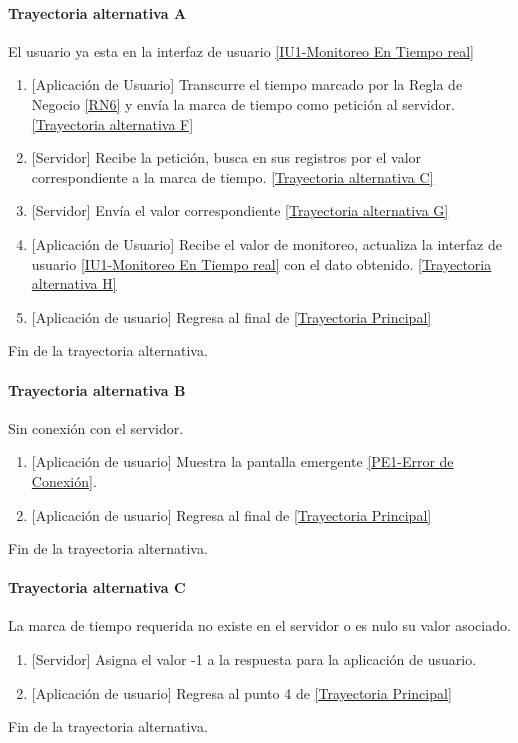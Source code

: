 \paragraph{Trayectoria alternativa A} \label{SUB-U-CU1.5:TA}
	El usuario ya esta en la interfaz de usuario \hyperref[fig:monitoreo]{[IU1-Monitoreo En Tiempo real]}
	\begin{enumerate}[label=A\arabic*.]
		\item {[Aplicación de Usuario]} Transcurre el tiempo marcado por la Regla de Negocio \ref{RN6} y envía la marca de tiempo como petición al servidor. \hyperref[SUB-U-CU1.5:TF]{[Trayectoria alternativa F]} 
		\item {[Servidor]} Recibe la petición, busca en sus registros por el valor correspondiente a la marca de tiempo. \hyperref[SUB-U-CU1.5:TC]{[Trayectoria alternativa C]} 
		\item  {[Servidor]} Envía el valor correspondiente \hyperref[SUB-U-CU1.5:TG]{[Trayectoria alternativa G]}
        \item {[Aplicación de Usuario]} Recibe el valor de monitoreo, actualiza la interfaz de usuario \hyperref[fig:monitoreo]{[IU1-Monitoreo En Tiempo real]} con el dato obtenido.
        \hyperref[SUB-U-CU1.5:TH]{[Trayectoria alternativa H]}
        \item {[Aplicación de usuario]} Regresa al final de \hyperref[SUB-U-CU1.5:TP]{[Trayectoria Principal]}
	\end{enumerate}
	Fin de la trayectoria alternativa.

\paragraph{Trayectoria alternativa B} \label{SUB-U-CU1.5:TB}
	Sin conexión con el servidor.
	\begin{enumerate}[label=B\arabic*.]
		\item {[Aplicación de usuario]} Muestra la pantalla emergente \hyperref[fig:Error de Conexion]{[PE1-Error de Conexión]}.
		\item {[Aplicación de usuario]} Regresa al final de \hyperref[SUB-U-CU1.5:TP]{[Trayectoria Principal]}
	\end{enumerate}
	Fin de la trayectoria alternativa.

\paragraph{Trayectoria alternativa C} \label{SUB-U-CU1.5:TC}
	La marca de tiempo requerida no existe en el servidor o es nulo su valor asociado.
	\begin{enumerate}[label=C\arabic*.]
		\item {[Servidor]} Asigna el valor -1 a la respuesta para la aplicación de usuario.
		\item {[Aplicación de usuario]} Regresa al punto 4 de \hyperref[SUB-U-CU1.5:TP]{[Trayectoria Principal]}
	\end{enumerate}
	Fin de la trayectoria alternativa.

